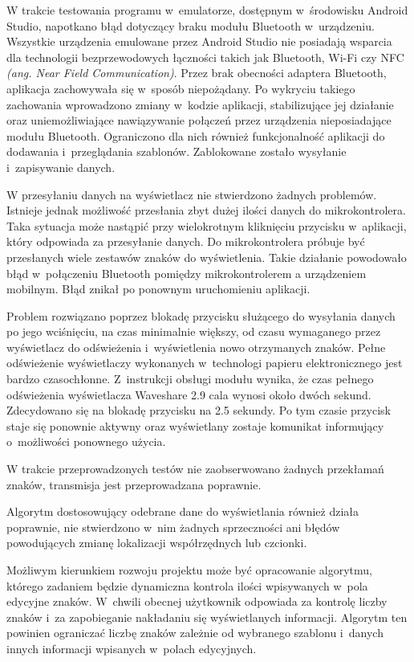 \documentclass[a4paper,12pt, twoside]{article}
\begin{document}
    	W trakcie testowania programu w~emulatorze, dostępnym w~środowisku Android Studio, napotkano błąd dotyczący braku modułu Bluetooth w~urządzeniu. Wszystkie urządzenia emulowane przez Android Studio nie posiadają wsparcia dla technologii bezprzewodowych łączności takich jak Bluetooth, Wi-Fi czy NFC \textit{(ang. Near Field Communication)}. Przez brak obecności adaptera Bluetooth, aplikacja zachowywała się w~sposób niepożądany. Po wykryciu takiego zachowania wprowadzono zmiany w~kodzie aplikacji, stabilizujące jej działanie oraz uniemożliwiające nawiązywanie połączeń przez urządzenia nieposiadające modułu Bluetooth. Ograniczono dla nich również funkcjonalność aplikacji do dodawania i~przeglądania szablonów. Zablokowane zostało wysyłanie i~zapisywanie danych.
    	
    	W przesyłaniu danych na wyświetlacz nie stwierdzono żadnych problemów. Istnieje jednak możliwość przesłania zbyt dużej ilości danych do mikrokontrolera. Taka sytuacja może nastąpić przy wielokrotnym kliknięciu przycisku w~aplikacji, który odpowiada za przesyłanie danych. Do mikrokontrolera próbuje być przesłanych wiele zestawów znaków do wyświetlenia. Takie działanie powodowało błąd w~połączeniu Bluetooth pomiędzy mikrokontrolerem a urządzeniem mobilnym. Błąd znikał po ponownym uruchomieniu aplikacji.
    	
    	Problem rozwiązano poprzez blokadę przycisku służącego do wysyłania danych po jego wciśnięciu, na czas minimalnie większy, od czasu wymaganego przez wyświetlacz do odświeżenia i~wyświetlenia nowo otrzymanych znaków. Pełne odświeżenie wyświetlaczy wykonanych w~technologi papieru elektronicznego jest bardzo czasochłonne. Z~instrukcji obsługi modułu wynika, że czas pełnego odświeżenia wyświetlacza Waveshare 2.9 cala wynosi około dwóch sekund\cite{waveshare}. Zdecydowano się na blokadę przycisku na 2.5 sekundy. Po tym czasie przycisk staje się ponownie aktywny oraz wyświetlany zostaje komunikat informujący o~możliwości ponownego użycia. 
    	
    	W trakcie przeprowadzonych testów nie zaobserwowano żadnych przekłamań znaków, transmisja jest przeprowadzana poprawnie. 
    	
    	Algorytm dostosowujący odebrane dane do wyświetlania również działa poprawnie, nie stwierdzono w~nim żadnych sprzeczności ani błędów powodujących zmianę lokalizacji współrzędnych lub czcionki.
    	
    	Możliwym kierunkiem rozwoju projektu może być opracowanie algorytmu, którego zadaniem będzie dynamiczna kontrola ilości wpisywanych w~pola edycyjne znaków. W~chwili obecnej użytkownik odpowiada za kontrolę liczby znaków i~za zapobieganie nakładaniu się wyświetlanych informacji. Algorytm ten powinien ograniczać liczbę znaków zależnie od wybranego szablonu i~danych innych informacji wpisanych w~polach edycyjnych.
\end{document}
